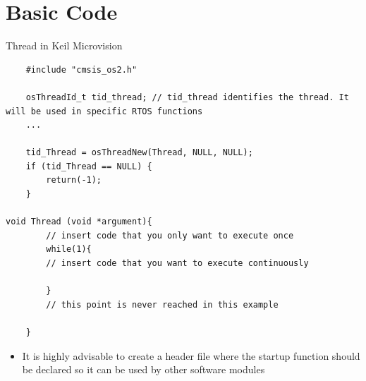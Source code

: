 \section{Basic Code}
\begin{frame}[fragile]{Thread in Keil Microvision}
    \begin{verbatim}
    #include "cmsis_os2.h"

    osThreadId_t tid_thread; // tid_thread identifies the thread. It will be used in specific RTOS functions
    ...

    tid_Thread = osThreadNew(Thread, NULL, NULL);
    if (tid_Thread == NULL) {
        return(-1);
    }

void Thread (void *argument){
        // insert code that you only want to execute once
        while(1){
        // insert code that you want to execute continuously

        }
        // this point is never reached in this example

    }
    \end{verbatim}
    \begin{itemize}
        \item It is highly advisable to create a header file where the startup function should be declared so it can be used by other software modules

    \end{itemize}
\end{frame}

